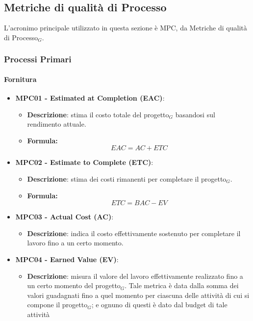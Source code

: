 \documentclass[10pt]{article}
\begin{document}
\begin{justify}
\subsection{Metriche di qualità di Processo}
L'acronimo principale utilizzato in questa sezione è MPC, da Metriche di qualità di Processo$_G$.

\subsubsection{Processi Primari}
\paragraph{Fornitura}
\begin{itemize}
    \item \textbf{MPC01 - Estimated at Completion (EAC)}:
    \begin{itemize}
        \item   \textbf{Descrizione}: stima il costo totale del progetto$_G$ basandosi sul rendimento attuale.
        \item   \textbf{Formula:}
                \[
                EAC = AC + ETC
                \]
    \end{itemize}
    \item \textbf{MPC02 - Estimate to Complete (ETC)}:
    \begin{itemize}
        \item   \textbf{Descrizione}: stima dei costi rimanenti per completare il progetto$_G$.
        \item   \textbf{Formula:}
                \[
                ETC = BAC - EV
                \]
    \end{itemize}
    \item \textbf{MPC03 - Actual Cost (AC)}:
    \begin{itemize}
        \item \textbf{Descrizione}: indica il costo effettivamente sostenuto per completare il lavoro fino a un certo momento.
    \end{itemize}
    \item \textbf{MPC04 - Earned Value (EV)}:
        \begin{itemize}
            \item \textbf{Descrizione}: misura il valore del lavoro effettivamente realizzato fino a un certo momento del progetto$_G$. Tale metrica è data dalla somma
            dei valori guadagnati fino a quel momento per ciascuna delle attività di cui si compone il progetto$_G$; e ognuno di questi è dato dal budget di tale attività

\end{itemize}
\end{itemize}
\end{justify}
\end{document}

